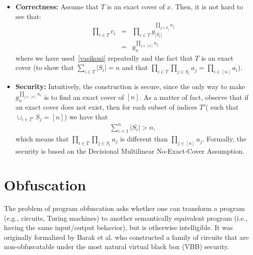 \documentclass[12pt]{tufte-book}
\begin{document}
\begin{itemize}

\item \textbf{Correctness:} Assume that $T$ is an exact cover of $x$. Then, it is not hard to see that:
\begin{eqnarray*}
\prod_{i \in T} c_i & = & \prod_{i \in T} g^{\prod_{j\in S_j} a_j}_{|S_i|} \\
& = & g_n^{\prod_{j \in [n]}a_j}
\end{eqnarray*}
where we have used~\eqref{vasikoni} repeatedly and the fact that $T$ is an exact cover (to show that $\sum_{i \in T} |S_i| = n$ and that $\prod_{i \in T} \prod_{j \in S_i} a_j = \prod_{i \in [n]} a_i$).

\item \textbf{Security:} Intuitively, the construction is secure, since the only way to make $g_n^{\prod_{ j \in [n] }a_i}$ is to find an exact cover of $[n]$.  As a matter of fact, observe that if an exact cover does not exist, then for each subset of indices $T'$( such that $\cup_{i \in T'}S_j  = [n]$) we have that
\begin{align*}
\sum_{i =1 }^{n} |S_i| > n,
\end{align*}
which means that   $\prod_{i \in T} \prod_{j \in S_i} a_j$ is different than $\prod_{j \in [n]}a_j$. Formally, the security is based on the Decisional Multilinear No-Exact-Cover Assumption.

\end{itemize}







\newcommand{\ABS}[1]{\left\vert#1\right\vert}
\newcommand{\SET}[1]{\left\{#1\right\}}  
\newcommand{\INP}[1]{\left(#1\right)}
\newcommand{\POLY}[1]{\ensuremath{\mathop{\mathrm{poly}}\INP{#1}}}
\newcommand{\ENC}[1]{\ensuremath{\mathop{\mathrm{Enc}}\INP{#1}}}
\newcommand{\DEC}[1]{\ensuremath{\mathop{\mathrm{Dec}}\INP{#1}}}


\section{Obfuscation}
The problem of program obfuscation asks whether one can transform a program (e.g., circuits, Turing machines) to another semantically equivalent program (i.e., having the same input/output behavior), but is otherwise intelligible.
It was originally formalized by Barak et al. who constructed a family of circuits that are non-obfuscatable under the most natural virtual black box (VBB) security.
\end{document}
